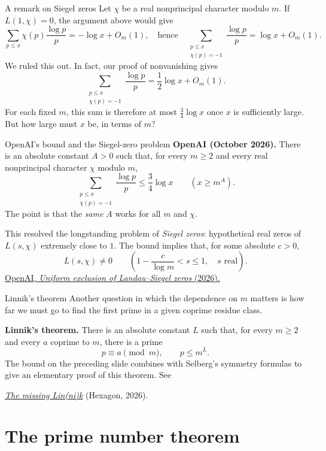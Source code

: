 \documentclass[aspectratio=169,11pt]{beamer}
\newcommand{\link}[2]{{\color{teal}\href{#1}{#2}}}
\newcommand{\oaurl}{https://github.com/openai/math/blob/main/preprints/Uniform-exclusion-of-Landau-Siegel-zeros-October-1-2026/paper.pdf}
\begin{document}
\begin{frame}{A remark on Siegel zeros}
Let $\chi$ be a real nonprincipal character modulo $m$. If $L(1,\chi)=0$, the argument above would give
\[
\sum_{p\le x}\chi(p)\frac{\log p}{p}=-\log x+O_m(1),
\quad\text{hence}\quad
\sum_{\substack{p\le x\\\chi(p)=-1}}\frac{\log p}{p}=\log x+O_m(1).
\]
We ruled this out. In fact, our proof of nonvanishing gives
\[
\sum_{\substack{p\le x\\\chi(p)=-1}}\frac{\log p}{p}=\frac12\log x+O_m(1).
\]
For each fixed $m$, this sum is therefore at most $\frac34\log x$ once $x$ is sufficiently large. But how large must $x$ be, in terms of $m$?
\end{frame}
\begin{frame}{OpenAI's bound and the Siegel-zero problem}
\textbf{OpenAI (October 2026).} There is an absolute constant $A>0$ such that, for every $m\ge2$ and every real nonprincipal character $\chi$ modulo $m$,
\[
\sum_{\substack{p\le x\\\chi(p)=-1}}\frac{\log p}{p}\le\frac34\log x
\qquad(x\ge m^A).
\]
The point is that the \emph{same} $A$ works for all $m$ and $\chi$.

This resolved the longstanding problem of \emph{Siegel zeros}: hypothetical real zeros of $L(s,\chi)$ extremely close to $1$. The bound implies that, for some absolute $c>0$,
\[
L(s,\chi)\ne0\qquad\left(1-\frac{c}{\log m}<s\le1,\quad s\text{ real}\right).
\]
{\scriptsize\link{\oaurl}{OpenAI, \emph{Uniform exclusion of Landau--Siegel zeros} (2026).}}
\end{frame}
\begin{frame}{Linnik's theorem}
Another question in which the dependence on $m$ matters is how far we must go to find the first prime in a given coprime residue class.

\textbf{Linnik's theorem.} There is an absolute constant $L$ such that, for every $m\ge2$ and every $a$ coprime to $m$, there is a prime
\[
p\equiv a\pmod m,\qquad p\le m^L.
\]
The bound on the preceding slide combines with Selberg's symmetry formulas to give an elementary proof of this theorem. See

\link{https://hexagonmath.org/2610.00545v1}{\emph{The missing Lin(ni)k}} (Hexagon, 2026).
\end{frame}


\section{The prime number theorem}
\end{document}
